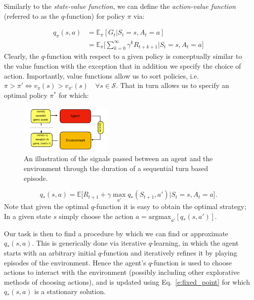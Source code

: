 \documentclass[twocolumn,preprintnumbers,amsmath,amssymb,notitlepage,nofootinbib,longbibliography,superscriptaddress,aps,pra,10pt]{revtex4-1}
\begin{document}
	Similarly to the \textit{state-value function}, we can define the \textit{action-value function} (referred to as the $q$-function) for policy $\pi$ via:

	\begin{align}
		q_{\pi}(s,a) &= \mathbb{E}_{\pi}[G_t|S_t = s, A_t = a]  \\
		& = \mathbb{E}_{\pi} \Big[\sum_{k = 0}^{\infty}\gamma^k R_{t+k+1}\Big| S_t = s, A_t = a \Big]
	\end{align}
	Clearly, the $q$-function with respect to a given policy is conceptually similar to the value function with the exception that in addition we specify
	the choice of action. Importantly, value functions allow us to sort policies, i.e. $\pi > \pi' \iff v_{\pi}(s) > v_{\pi'}(s)\quad \forall s \in \mathcal{S} $.
	That in turn allows us to specify an optimal policy $\pi^*$ for which:

	\begin{figure}
		\centering
		\includegraphics[width=0.4\textwidth]{figures/agent_environment.pdf}
		\caption{
			An illustration of the signals passed between an agent and the environment through the duration of a sequential turn based episode.
		}
		\label{f:agent_environment}
	\end{figure}

	\begin{equation}\label{e:fixed_point}
		q_*(s,a) = \mathbb{E}\big[R_{t+1} + \gamma\max_{a'}q_{*}(S_{t+1},a')\big|S_t = s, A_t = a \big].
	\end{equation}
	Note that given the optimal $q$-function it is easy to obtain the optimal strategy; In a given state $s$ simply choose the action $a = \mathrm{argmax}_{a'}[q_*(s,a')]$.

	Our task is then to find a procedure by which we can find or approximate $q_*(s,a)$. This is generically done via iterative $q$-learning, in which the agent
	starts with an arbitrary initial $q$-function and iteratively refines it by playing episodes of the environment. Hence the agent's $q$-function is used to
	choose actions to interact with the environment (possibly including other explorative methods of choosing actions),
	and is updated using Eq.~\eqref{e:fixed_point} for which $q_*(s,a)$ is a stationary solution.
\end{document}

